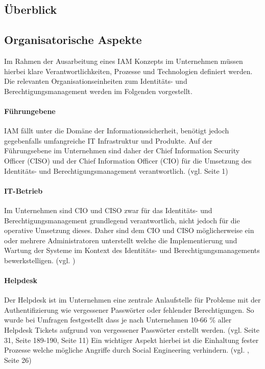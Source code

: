 \documentclass[11pt]{article}
\begin{document}
\subsection{Überblick}
\subsection{Organisatorische Aspekte}
Im Rahmen der Ausarbeitung eines IAM Konzepts im Unternehmen müssen hierbei klare Verantwortlichkeiten, Prozesse und Technologien definiert werden. Die relevanten Organisationseinheiten zum Identitäts- und Berechtigungsmanagement werden im Folgenden vorgestellt.
\paragraph{Führungebene}
IAM fällt unter die Domäne der Informationssicherheit, benötigt jedoch gegebenfalls umfangreiche IT Infrastruktur und Produkte. Auf der Führungsebene im Unternehmen sind daher der Chief Information Security Officer (CISO) und der Chief Information Officer (CIO) für die Umsetzung des Identitäts- und Berechtigungsmanagement verantwortlich. (vgl. \cite{mont2010economics} Seite 1)
\paragraph{IT-Betrieb}
Im Unternehmen sind CIO und CISO zwar für das Identitäts- und Berechtigungsmanagement grundlegend verantwortlich, nicht jedoch für die operative Umsetzung dieses. Daher sind dem CIO und CISO möglicherweise ein oder mehrere Administratoren unterstellt welche die Implementierung und Wartung der Systeme im Kontext des Identitäts- und Berechtigungsmanagements bewerkstelligen. (vgl. \cite{microsoft2024iamadmin})
\paragraph{Helpdesk}
Der Helpdesk ist im Unternehmen eine zentrale Anlaufstelle für Probleme mit der Authentifizierung wie vergessener Passwörter oder fehlender Berechtigungen. So wurde bei Umfragen festgestellt dass je nach Unternehmen 10-66 \% aller Helpdesk Tickets aufgrund von vergessener Passwörter erstellt werden. (vgl. \cite{ylen2004centralized} Seite 31, \cite{tsolkas2017} Seite 189-190, \cite{hummer2016adaptive} Seite 11) Ein wichtiger Aspekt hierbei ist die Einhaltung fester Prozesse welche mögliche Angriffe durch Social Engineering verhindern. (vgl. \cite{wood2005implementing}, \cite{ylen2004centralized} Seite 26)
\end{document}
